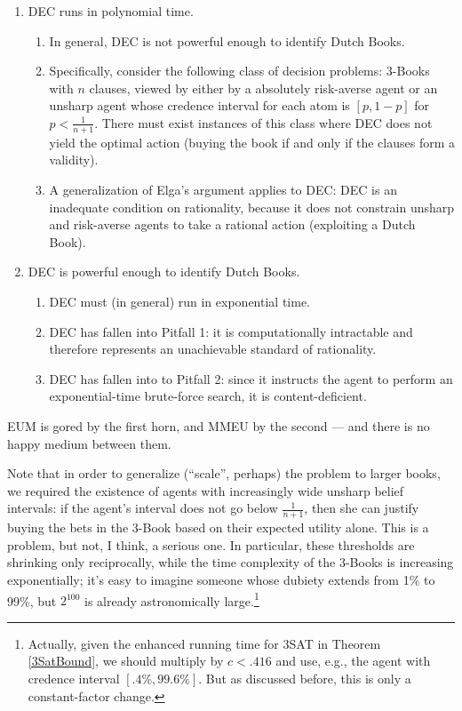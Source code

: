 \documentclass[letterpaper,12pt]{article}
\begin{document}
\begin{enumerate}
\item
DEC runs in polynomial time.
\begin{enumerate}
\item
In general, DEC is not powerful enough to identify Dutch Books.
\item
Specifically, consider the following class of decision problems: 3-Books with $n$ clauses, viewed by either by a absolutely risk-averse agent or an unsharp agent whose credence interval for each atom is $[p, 1-p]$ for $p < \frac{1}{n+1}$. There must exist instances of this class where DEC does not yield the optimal action (buying the book if and only if the clauses form a validity).
\item
A generalization of Elga's argument applies to DEC: DEC is an inadequate condition on rationality, because it does not constrain unsharp and risk-averse agents to take a rational action (exploiting a Dutch Book).
\end{enumerate}
\item
DEC is powerful enough to identify Dutch Books.
\begin{enumerate}
\item
DEC must (in general) run in exponential time.
\item
DEC has fallen into Pitfall 1: it is computationally intractable and therefore represents an unachievable standard of rationality.
\item
DEC has fallen into to Pitfall 2: since it instructs the agent to perform an exponential-time brute-force search, it is content-deficient.
\end{enumerate}
\end{enumerate}

EUM is gored by the first horn, and MMEU by the second --- and there is no happy medium between them.

Note that in order to generalize (``scale'', perhaps) the problem to larger books, we required the existence of agents with increasingly wide unsharp belief intervals: if the agent's interval does not go below $\frac{1}{n+1}$, then she can justify buying the bets in the 3-Book based on their expected utility alone. This is a problem, but not, I think, a serious one. In particular, these thresholds are shrinking only reciprocally, while the time complexity of the 3-Books is increasing exponentially; it's easy to imagine someone whose dubiety extends from 1\% to 99\%, but $2^{100}$ is already astronomically large.\footnote{Actually, given the enhanced running time for 3SAT in Theorem \ref{3SatBound}, we should multiply by $c < .416$ and use, e.g., the agent with credence interval $[.4\%, 99.6\%]$. But as discussed before, this is only a constant-factor change.}
\end{document}
